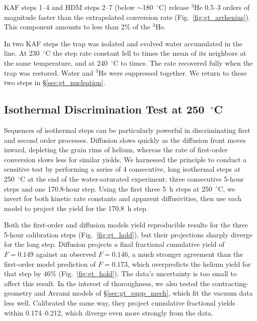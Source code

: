 KAF steps 1--4 and HDM steps 2--7
(below $\sim$180~$^\circ$C) release $^3$He 0.5--3 orders of magnitude faster than the extrapolated 
conversion rate (Fig.~\ref{fig:gt_arrhenius}). This component amounts
to less than 2\% of the $^3$He.

In two KAF steps the trap was isolated and evolved water accumulated in the line. At
230~$^\circ$C the step rate constant fell to \ChTwoKinTrapSuppLow{} times the mean of its neighbors at the same
temperature, and at 240~$^\circ$C to \ChTwoKinTrapSuppHigh{} times. The rate recovered fully when the trap was
restored. Water and $^3$He were suppressed together. We return to these two steps in \S\ref{sec:gt_nucleation}.

\subsection{Isothermal Discrimination Test at 250~$^\circ$C}\label{sec:gt_hold_results}

Sequences of isothermal steps can be particularly powerful in discriminating first and second order processes.
Diffusion slows quickly as the diffusion front moves inward, depleting the grain
rims of helium, whereas the rate of first-order conversion slows less for similar yields. We harnessed the principle to conduct a sensitive test
by performing a series of 4 consecutive, long isothermal steps at 250~$^\circ$C at the end of the water-saturated experiment: three consecutive 5-hour steps and one 170.8-hour step. Using the first three
5~h steps at 250~$^\circ$C, we invert for both kinetic rate constants and apparent diffusivities, then use each model to project the yield for the 170.8~h step.

Both the first-order and diffusion models yield reproducible results for the three 5-hour calibration steps (Fig.~\ref{fig:gt_hold}), but their 
projections sharply diverge for the long step. Diffusion projects a final fractional cumulative yield of $F = 0.149$ against 
an observed $F = 0.146$, a much stronger agreement than the first-order model prediction of $F = 0.173$, which overpredicts
the helium yield for that step by 46\% (Fig.~\ref{fig:gt_hold}). The data's uncertainty is too small to affect this result. In the interest of thoroughness, 
we also tested the contracting-geometry and Avrami models of \S\ref{sec:gt_supp_mech}, which fit the vacuum data less well. 
Calibrated the same way, they project cumulative fractional yields within 0.174--0.212, which diverge even more strongly from the data.

